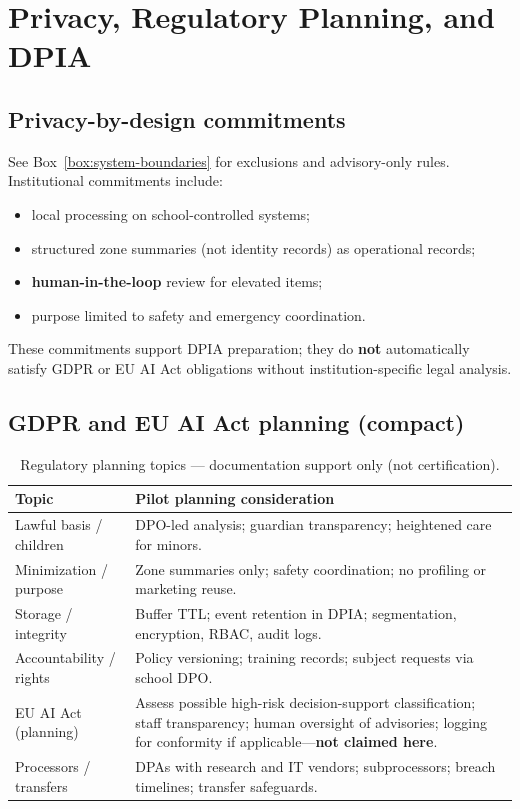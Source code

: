 \section{Privacy, Regulatory Planning, and DPIA}
\label{sec:privacy-gdpr}
\label{sec:dpia}

\subsection{Privacy-by-design commitments}

See Box~\ref{box:system-boundaries} for exclusions and advisory-only rules.
Institutional commitments include:

\begin{itemize}[noitemsep]
  \item local processing on school-controlled systems;
  \item structured zone summaries (not identity records) as operational records;
  \item \textbf{human-in-the-loop} review for elevated items;
  \item purpose limited to safety and emergency coordination.
\end{itemize}

These commitments support DPIA preparation; they do \textbf{not} automatically satisfy GDPR or
EU AI Act obligations without institution-specific legal analysis.

\subsection{GDPR and EU AI Act planning (compact)}

\begin{table}[htbp]
  \centering
  \caption{Regulatory planning topics --- documentation support only (not certification).}
  \label{tab:gdpr-ai-planning}
  \small
  \begin{tabular}{@{}p{2.4cm}p{8.6cm}@{}}
    \toprule
    Topic & Pilot planning consideration \\
    \midrule
    Lawful basis / children &
      DPO-led analysis; guardian transparency; heightened care for minors. \\
    Minimization / purpose &
      Zone summaries only; safety coordination; no profiling or marketing reuse. \\
    Storage / integrity &
      Buffer TTL; event retention in DPIA; segmentation, encryption, RBAC, audit logs. \\
    Accountability / rights &
      Policy versioning; training records; subject requests via school DPO. \\
    EU AI Act (planning) &
      Assess possible high-risk decision-support classification; staff transparency;
      human oversight of advisories; logging for conformity if applicable---\textbf{not claimed here}. \\
    Processors / transfers &
      DPAs with research and IT vendors; subprocessors; breach timelines; transfer safeguards. \\
    \bottomrule
  \end{tabular}
\end{table}

